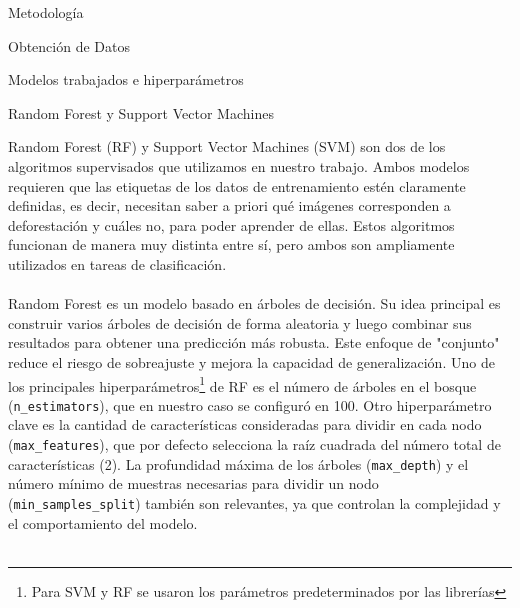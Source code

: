 \documentclass[11pt]{article}
\begin{document}
\begin{section}{Metodología}
\begin{subsection}{Obtención de Datos}
\begin{subsection}{Modelos trabajados e hiperparámetros}

\begin{subsubsection}{Random Forest y Support Vector Machines}

Random Forest (RF) y Support Vector Machines (SVM) son dos de los algoritmos supervisados que utilizamos en nuestro trabajo. Ambos modelos requieren que las etiquetas de los datos de entrenamiento estén claramente definidas, es decir, necesitan saber a priori qué imágenes corresponden a deforestación y cuáles no, para poder aprender de ellas. Estos algoritmos funcionan de manera muy distinta entre sí, pero ambos son ampliamente utilizados en tareas de clasificación.
\\
\\
Random Forest es un modelo basado en árboles de decisión. Su idea principal es construir varios árboles de decisión de forma aleatoria y luego combinar sus resultados para obtener una predicción más robusta. Este enfoque de "conjunto" reduce el riesgo de sobreajuste y mejora la capacidad de generalización. 
Uno de los principales hiperparámetros\footnote{Para SVM y RF se usaron los parámetros predeterminados por las librerías} de RF es el número de árboles en el bosque (\texttt{n\_estimators}), que en nuestro caso se configuró en 100. Otro hiperparámetro clave es la cantidad de características consideradas para dividir en cada nodo (\texttt{max\_features}), que por defecto selecciona la raíz cuadrada del número total de características (2). La profundidad máxima de los árboles (\texttt{max\_depth}) y el número mínimo de muestras necesarias para dividir un nodo (\texttt{min\_samples\_split}) también son relevantes, ya que controlan la complejidad y el comportamiento del modelo.
\\
\\

\end{subsubsection}
\end{subsection}
\end{subsection}
\end{section}
\end{document}

